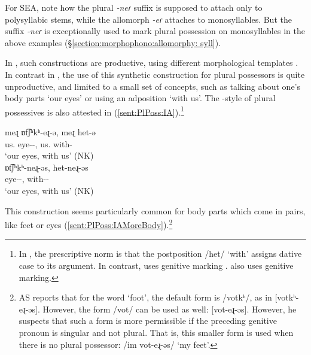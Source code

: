 For SEA, note how the plural \textit{-neɾ} suffix is supposed to attach only to  polysyllabic stems, while the allomorph \textit{-eɾ} attaches to   monosyllables. But the suffix \textit{-neɾ}  is exceptionally used to mark plural possession on monosyllables in the above examples (\S\ref{section:morphophono:allomorphy: syll}). 

In {\swaSWA},  such constructions are   productive,  using     different morphological templates \citep{Vaux-2013-NumberPolysyllabicPoss,Bezrukov-2016-MA}.  In contrast in {\seaSEA}, the use of this synthetic construction for plural possessors is quite unproductive, and limited to      a small set of concepts, such as talking about one's body parts  `our eyes' or using an adposition `with us'. The {\seaAbbre}-style of plural possessives is   also attested in {\iaIA} (\ref{sent:PlPoss:IA}).\footnote{%
	In {\seaAbbre}, the prescriptive norm is that the postposition /het/ `with' assigns dative case to its argument. In contrast, {\seaCEAAbbre}  uses   genitive marking \citep[297--299]{DumTragut-2009-ArmenianReferenceGrammar}. {\iaAbbre} also uses   genitive marking.}


\begin{exe}
	\ex {\iaIA}  \label{sent:PlPoss:IA} 
	\begin{xlist}
		\ex \gll  meɻ ɒt͡ʃʰkʰ-eɻ-ə, meɻ het-ə  \\
		us.{\gen} eye-{\pl}-{}, us.{\gen} with-{} \\ 
		\trans `our eyes, with us'  \hfill (NK)\\
		\ex \gll   ɒt͡ʃʰkʰ-neɻ-əs, het-neɻ-əs \\
		eye-{\pl}-{\possFsg}, with-{\pl}-{\possFsg} \\ 
		\trans `our eyes, with us' \hfill (NK)\\
	\end{xlist}
\end{exe}

This construction seems particularly common for body parts which come in pairs, like feet or eyes (\ref{sent:PlPoss:IAMoreBody}).\footnote{%
	AS reports that for the word `foot', the default form is /votkʰ/, as in [votkʰ-eɻ-əs]. However, the form /vot/ can be used as well: [vot-eɻ-əs]. However, he suspects that such a form is more permissible if the preceding genitive pronoun is singular and not plural. That is, this smaller form is used when there is no plural possessor: /im vot-eɻ-əs/ `my feet'. } 





